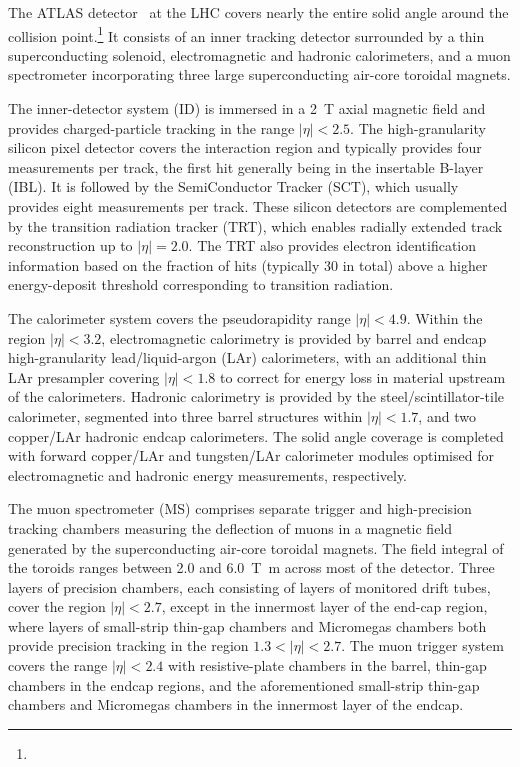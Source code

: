 The ATLAS detector~\cite{PERF-2007-01,GENR-2019-02} at the LHC covers nearly the entire solid angle around the collision point.\footnote{\AtlasCoordFootnote}
It consists of an inner tracking detector surrounded by a thin superconducting solenoid, electromagnetic and hadronic calorimeters,
and a muon spectrometer incorporating three large superconducting air-core toroidal magnets.

The inner-detector system (ID) is immersed in a \qty{2}{\tesla} axial magnetic field 
and provides charged-particle tracking in the range \(|\eta| < 2.5\).
The high-granularity silicon pixel detector covers the interaction region and typically provides four measurements per track, 
the first hit generally being in the insertable B-layer (IBL). %
It is followed by the SemiConductor Tracker (SCT), which usually provides eight measurements per track.
These silicon detectors are complemented by the transition radiation tracker (TRT),
which enables radially extended track reconstruction up to \(|\eta| = 2.0\). 
The TRT also provides electron identification information 
based on the fraction of hits (typically 30 in total) above a higher energy-deposit threshold corresponding to transition radiation.

The calorimeter system covers the pseudorapidity range \(|\eta| < 4.9\).
Within the region \(|\eta|< 3.2\), electromagnetic calorimetry is provided by barrel and 
endcap high-granularity lead/liquid-argon (LAr) calorimeters,
with an additional thin LAr presampler covering \(|\eta| < 1.8\)
to correct for energy loss in material upstream of the calorimeters.
Hadronic calorimetry is provided by the steel/scintillator-tile calorimeter,
segmented into three barrel structures within \(|\eta| < 1.7\), and two copper/LAr hadronic endcap calorimeters.
The solid angle coverage is completed with forward copper/LAr and tungsten/LAr calorimeter modules
optimised for electromagnetic and hadronic energy measurements, respectively.

The muon spectrometer (MS) comprises separate trigger and
high-precision tracking chambers measuring the deflection of muons in a magnetic field generated by the superconducting air-core toroidal magnets.
The field integral of the toroids ranges between \num{2.0} and \qty{6.0}{\tesla\metre}
across most of the detector. 
Three layers of precision chambers, each consisting of layers of monitored drift tubes, cover the region \(|\eta| < 2.7\),
except in the innermost layer of the end-cap region, where layers of small-strip thin-gap chambers and Micromegas chambers both provide precision tracking in the region \(1.3 < |\eta| < 2.7\).
The muon trigger system covers the range \(|\eta| < 2.4\) with resistive-plate chambers in the barrel, thin-gap chambers in the endcap regions, and the aforementioned small-strip thin-gap chambers and Micromegas chambers in the innermost layer of the endcap.

